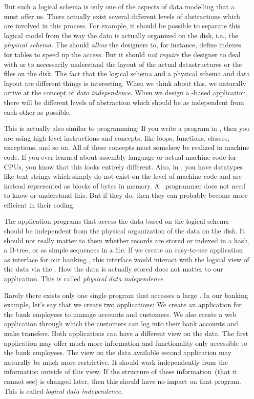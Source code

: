 But such a logical schema is only one of the aspects of data modelling that a  must offer us.
There actually exist several different levels of abstractions which are involved in this process.
For example, it should be possible to separate this logical model from the way the data is actually organized on the disk, i.e., the \emph{physical schema}.
The  should \emph{allow} the  designers to, for instance, define indexes for tables to speed up the access.
But it should \emph{not require} the designer to deal with or to necessarily understand the layout of the actual datastructures or the files on the disk.%
%
\endhsection%
%
%
The fact that the logical schema and a physical schema and data layout are different things is interesting.
When we think about this, we naturally arrive at the concept of \emph{data independence}.
When we design a -based application, there will be different levels of abstraction which should be as independent from each other as possible.

This is actually also similar to programming:
If you write a program in \python, then you are using high-level instructions and concepts, like loops, functions, classes, exceptions, and so on.
All of these concepts must somehow be realized in machine code.
If you ever learned about assembly language or actual machine code for CPUs, you know that this looks entirely different.
Also, in \python, you have datatypes like text strings which simply do not exist on the level of machine code and are instead represented as blocks of bytes in memory.
A \python\ programmer does not need to know or understand this.
But if they do, then they can probably become more efficient in their coding.

The application programs that access the data based on the logical schema should be independent from the physical organization of the data on the disk.
It should not really matter to them whether records are stored or indexed in a hash, a B\nobreakdashes-tree, or as simple sequences in a file.
If we create an easy-to-use application as interface for our banking , this interface would interact with the logical view of the data via the .
How the data is actually stored does not matter to our application.
This is called \emph{physical data independence}.

Rarely there exists only one single program that accesses a large \db.
In our banking example, let's say that we create two applications:
We create an application for the bank employees to manage accounts and customers.
We also create a web application through which the customers can log into their bank accounts and make transfers.
Both applications can have a different view on the data.
The first application may offer much more information and functionality only accessible to the bank employees.
The view on the data available second application may naturally be much more restrictive.
It should work independently from the information outside of this view.
If the structure of these information~(that it cannot see) is changed later, then this should have no impact on that program.
This is called \emph{logical data independence}.

